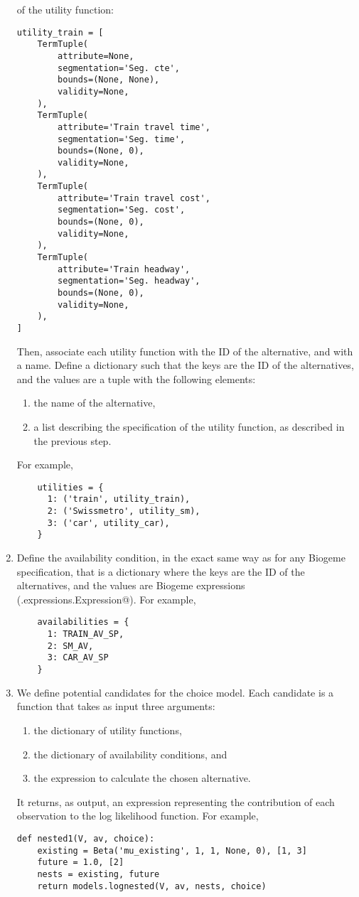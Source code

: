 \documentclass[12pt,a4paper]{article}
\begin{document}
\begin{enumerate}
  of the utility function:
  \begin{lstlisting}
utility_train = [
    TermTuple(
        attribute=None,
        segmentation='Seg. cte',
        bounds=(None, None),
        validity=None,
    ),
    TermTuple(
        attribute='Train travel time',
        segmentation='Seg. time',
        bounds=(None, 0),
        validity=None,
    ),
    TermTuple(
        attribute='Train travel cost',
        segmentation='Seg. cost',
        bounds=(None, 0),
        validity=None,
    ),
    TermTuple(
        attribute='Train headway',
        segmentation='Seg. headway',
        bounds=(None, 0),
        validity=None,
    ),
]
  \end{lstlisting}
Then, associate each utility function with the ID of the alternative,
  and with a name. Define a dictionary such that the keys are the ID
  of the alternatives, and the values are a tuple with the following
  elements:
  \begin{enumerate}
  \item the name of the alternative,
  \item a list describing the specification of the utility function,
    as described in the previous step.
  \end{enumerate}
  For example,
  \begin{lstlisting}
    utilities = {
      1: ('train', utility_train),
      2: ('Swissmetro', utility_sm),
      3: ('car', utility_car),
    }
  \end{lstlisting}
\item \label{item:avail}Define the availability condition, in the exact same way as
  for any Biogeme specification, that is a dictionary where the keys
  are the ID of the alternatives, and the values are Biogeme
  expressions (\lstinline@biogeme.expressions.Expression@). For
  example,
  \begin{lstlisting}
    availabilities = {
      1: TRAIN_AV_SP,
      2: SM_AV,
      3: CAR_AV_SP
    }
  \end{lstlisting}
\item \label{item:models}We define potential candidates for the choice model. Each
  candidate is a function that takes as input three arguments:
  \begin{enumerate}
  \item the dictionary of utility functions,
  \item the dictionary of availability conditions, and
  \item the expression to calculate the chosen alternative. 
  \end{enumerate}
  It returns, as output, an expression representing the
  contribution of each observation to the log likelihood function.
  For example,
  \begin{lstlisting}
def nested1(V, av, choice):
    existing = Beta('mu_existing', 1, 1, None, 0), [1, 3]
    future = 1.0, [2]
    nests = existing, future
    return models.lognested(V, av, nests, choice)
  \end{lstlisting}


\end{enumerate}
\end{document}
